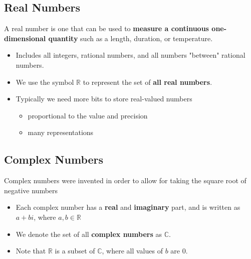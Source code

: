 \documentclass[10pt]{article}
\begin{document}
\subsection*{Real Numbers}
A real number is one that can be used to \textbf{measure a continuous one-dimensional quantity} such as a length, duration, or temperature.
\begin{itemize}
	\item Includes all integers, rational numbers, and all numbers "between" rational numbers.
	\item We use the symbol $\mathbb{R}$ to represent the set of \textbf{all real numbers}.
	\item Typically we need more bits to store real-valued numbers
	\begin{itemize}
	    \item proportional to the value and precision
	    \item many representations
    \end{itemize}
\end{itemize}

\subsection*{Complex Numbers}
Complex numbers were invented in order to allow for taking the square root of negative numbers
\begin{itemize}
	\item Each complex number has a \textbf{real} and \textbf{imaginary} part, and is written as $a + bi$, where $a, b \in \mathbb{R}$
    \item We denote the set of all \textbf{complex numbers} as $\mathbb{C}$.
    \item Note that $\mathbb{R}$ is a subset of $\mathbb{C}$, where all values of $b$ are 0.
\end{itemize}
\end{document}
